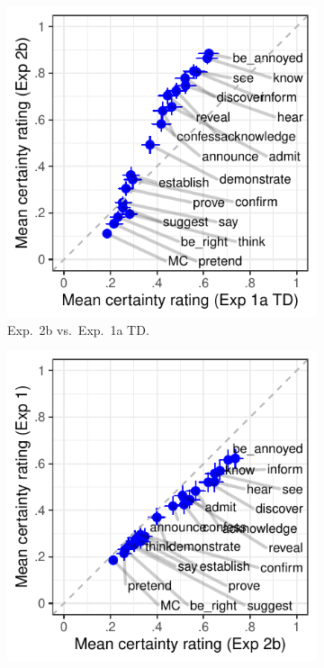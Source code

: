 \documentclass[11pt,fleqn]{article}
\newcommand{\6}{\mbox{$[\hspace*{-.6mm}[$}}
\newcommand{\9}{\mbox{$]\hspace*{-.6mm}]$}}
\begin{document}
\begin{figure}[h!]
\begin{subfigure}{.33\textwidth}
\includegraphics[width=\textwidth]{../../results/projection-comparisons/graphs/projection-comparison-35}
\caption{Exp.~2b vs.\ Exp.~1a TD.}
\label{f-projcomp1}
\end{subfigure}
\begin{subfigure}{.33\textwidth}
\includegraphics[width=\textwidth]{../../results/projection-comparisons/graphs/projection-comparison-39}

\end{subfigure}
\end{figure}
\end{document}
